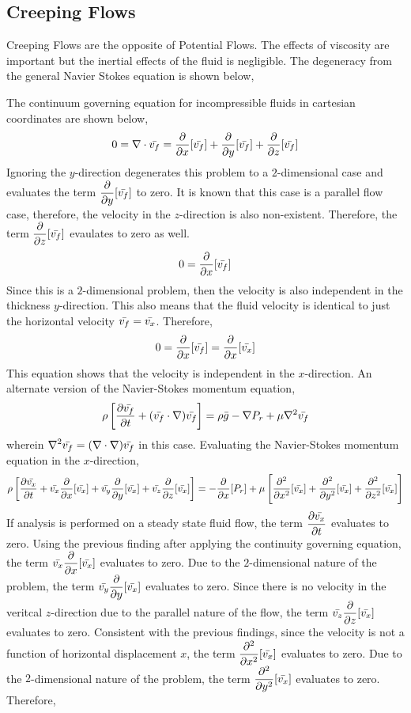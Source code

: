\documentclass[class=report, 12pt, crop=false]{standalone}
\begin{document}
\begin{center}
\chapter{Creeping Flows}
\begin{comment}
\end{comment}
Creeping Flows are the opposite of Potential Flows. The effects of viscosity are important but the inertial effects of the fluid is negligible. The degeneracy from the general Navier Stokes equation is shown below,
\begin{comment}
\end{comment}
The continuum governing equation for incompressible fluids in cartesian coordinates are shown below,
$$0 = \nabla\cdot\bar{v_f} = \frac{\partial}{\partial x}[\bar{v_f}] + \frac{\partial}{\partial y}[\bar{v_f}] + \frac{\partial}{\partial z}[\bar{v_f}]$$
Ignoring the $y$-direction degenerates this problem to a $2$-dimensional case and evaluates the term $\displaystyle{\frac{\partial}{\partial y}[\bar{v_f}]}$ to zero. It is known that this case is a parallel flow case, therefore, the velocity in the $z$-direction is also non-existent. Therefore, the term $\displaystyle{\frac{\partial}{\partial z}[\bar{v_f}]}$ evaulates to zero as well.  
$$0 = \frac{\partial}{\partial x}[\bar{v_f}]$$
Since this is a $2$-dimensional problem, then the velocity is also independent in the thickness $y$-direction. This also means that the fluid velocity is identical to just the horizontal velocity $\displaystyle{\bar{v_f} = \bar{v_x}}$. Therefore,
$$0 = \frac{\partial}{\partial x}[\bar{v_f}] = \frac{\partial}{\partial x}[\bar{v_x}]$$
This equation shows that the velocity is independent in the $x$-direction. 
An alternate version of the Navier-Stokes momentum equation,
$$\rho\left[\frac{\partial\bar{v_f}}{\partial t} + (\bar{v_f}\cdot\nabla)\bar{v_f}\right] = \rho \bar{g} - \nabla P_r + \mu\nabla^2\bar{v_f}$$
wherein $\displaystyle{\nabla^2 \bar{v_f} = (\nabla \cdot\nabla)\bar{v_f}}$ in this case. Evaluating the Navier-Stokes momentum equation in the $x$-direction,
$$\rho\left[\frac{\partial\bar{v_x}}{\partial t} + \bar{v_x}\frac{\partial}{\partial x}[\bar{v_x}] + \bar{v_y}\frac{\partial}{\partial y}[\bar{v_x}] + \bar{v_z}\frac{\partial}{\partial z}[\bar{v_x}]\right] = - \frac{\partial}{\partial x}[P_r] + \mu\left[\frac{\partial^2}{\partial x^2}[\bar{v_x}] + \frac{\partial^2}{\partial y^2}[\bar{v_x}] + \frac{\partial^2}{\partial z^2}[\bar{v_x}]\right]$$
If analysis is performed on a steady state fluid flow, the term $\displaystyle{\frac{\partial\bar{v_x}}{\partial t}}$ evaluates to zero. Using the previous finding after applying the continuity governing equation, the term $\displaystyle{\bar{v_x}\frac{\partial}{\partial x}[\bar{v_x}]}$ evaluates to zero. Due to the $2$-dimensional nature of the problem, the term $\displaystyle{\bar{v_y}\frac{\partial}{\partial y}[\bar{v_x}]}$ evaluates to zero. Since there is no velocity in the veritcal $z$-direction due to the parallel nature of the flow, the term $\displaystyle{\bar{v_z}\frac{\partial}{\partial z}[\bar{v_x}]}$ evaluates to zero. Consistent with the previous findings, since the velocity is not a function of horizontal displacement $x$, the term $\displaystyle{\frac{\partial^2}{\partial x^2}[\bar{v_x}]}$ evaluates to zero. Due to the $2$-dimensional nature of the problem, the term $\displaystyle{\frac{\partial^2}{\partial y^2}[\bar{v_x}]}$ evaluates to zero. Therefore,

\end{center}
\end{document}
